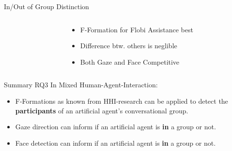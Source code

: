 \begin{frame}{In/Out of Group Distinction}
  \begin{columns}[T] %
    \begin{column}{.65\textwidth}
      \vspace{30pt}
    \end{column}
    \hspace{-0.1\textwidth}
    \begin{column}{.4\textwidth}
      \vspace{40pt}
      \small
      \begin{itemize}
        \item[-]<2-> F-Formation for Flobi Assistance best
        \item[-]<3-> Difference btw. others is neglible
        \item[\textcolor{mygreen}{\faArrowRight}]<4-> Both Gaze and Face Competitive 
      \end{itemize}
    \end{column}
  \end{columns}
\end{frame}
\begin{frame}{Summary RQ3}
  In Mixed Human-Agent-Interaction:\\ 
  \begin{itemize}
    \item[\textcolor{mygreen}{\faCheckCircle}]<2-> \textcolor{myblue}{F-Formation}s as known from HHI-research can be applied to detect the \textbf{participants} of an artificial agent's conversational group.
    \item[\textcolor{mygreen}{\faCheckCircle}]<3-> \textcolor{myblue}{Gaze direction} can inform if an artificial agent is \textbf{in} a group or not.
    \item[\textcolor{mygreen}{\faCheckCircle}]<4-> \textcolor{myblue}{Face detection} can inform if an artificial agent is \textbf{in} a group or not.
  \end{itemize}
\end{frame}
